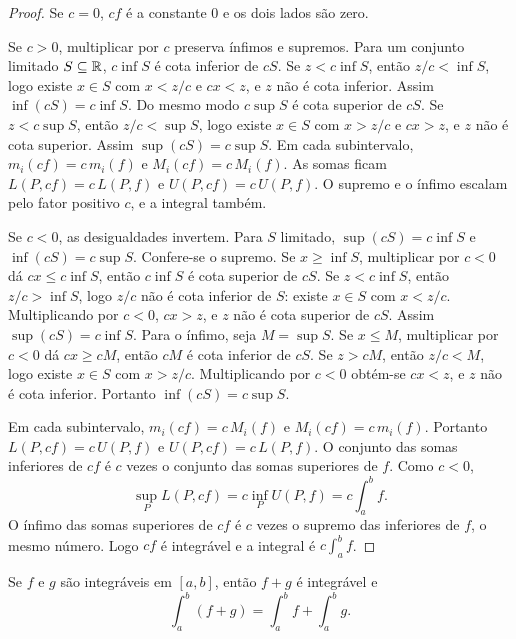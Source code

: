 \documentclass[11pt,a4paper]{article}
\begin{document}
\begin{proof}
Se $c=0$, $cf$ é a constante $0$ e os dois lados são zero.

Se $c>0$, multiplicar por $c$ preserva ínfimos e supremos. Para um conjunto limitado $S\subseteq\mathbb{R}$, $c\inf S$ é cota inferior de $cS$. Se $z<c\inf S$, então $z/c<\inf S$, logo existe $x\in S$ com $x<z/c$ e $cx<z$, e $z$ não é cota inferior. Assim $\inf(cS)=c\inf S$. Do mesmo modo $c\sup S$ é cota superior de $cS$. Se $z<c\sup S$, então $z/c<\sup S$, logo existe $x\in S$ com $x>z/c$ e $cx>z$, e $z$ não é cota superior. Assim $\sup(cS)=c\sup S$. Em cada subintervalo, $m_i(cf)=c\,m_i(f)$ e $M_i(cf)=c\,M_i(f)$. As somas ficam $L(P,cf)=c\,L(P,f)$ e $U(P,cf)=c\,U(P,f)$. O supremo e o ínfimo escalam pelo fator positivo $c$, e a integral também.

Se $c<0$, as desigualdades invertem. Para $S$ limitado, $\sup(cS)=c\inf S$ e $\inf(cS)=c\sup S$. Confere-se o supremo. Se $x\ge\inf S$, multiplicar por $c<0$ dá $cx\le c\inf S$, então $c\inf S$ é cota superior de $cS$. Se $z<c\inf S$, então $z/c>\inf S$, logo $z/c$ não é cota inferior de $S$: existe $x\in S$ com $x<z/c$. Multiplicando por $c<0$, $cx>z$, e $z$ não é cota superior de $cS$. Assim $\sup(cS)=c\inf S$. Para o ínfimo, seja $M=\sup S$. Se $x\le M$, multiplicar por $c<0$ dá $cx\ge cM$, então $cM$ é cota inferior de $cS$. Se $z>cM$, então $z/c<M$, logo existe $x\in S$ com $x>z/c$. Multiplicando por $c<0$ obtém-se $cx<z$, e $z$ não é cota inferior. Portanto $\inf(cS)=c\sup S$.

Em cada subintervalo, $m_i(cf)=c\,M_i(f)$ e $M_i(cf)=c\,m_i(f)$. Portanto $L(P,cf)=c\,U(P,f)$ e $U(P,cf)=c\,L(P,f)$. O conjunto das somas inferiores de $cf$ é $c$ vezes o conjunto das somas superiores de $f$. Como $c<0$,
\[
\sup_P L(P,cf)=c\inf_P U(P,f)=c\int_a^b f.
\]
O ínfimo das somas superiores de $cf$ é $c$ vezes o supremo das inferiores de $f$, o mesmo número. Logo $cf$ é integrável e a integral é $c\int_a^b f$.
\end{proof}

\begin{teorema}\label{teo:soma}
Se $f$ e $g$ são integráveis em $[a,b]$, então $f+g$ é integrável e
\[
\int_a^b(f+g)=\int_a^b f+\int_a^b g.
\]
\end{teorema}
\end{document}
